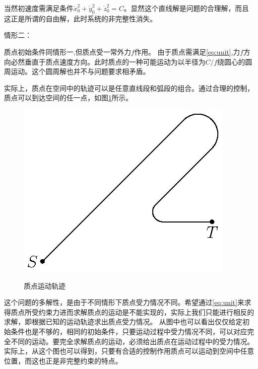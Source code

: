 \documentclass[A4,twoside]{ctexart}
\begin{document}
当然初速度需满足条件$\dot{x}_0^2+\dot{y}_0^2+\dot{z}_0^2 = C$。显然这个直线解是问题的合理解，而且这正是所谓的自由解，此时系统的非完整性消失。

情形二：

质点初始条件同情形一,但质点受一常外力$f$作用。
由于质点需满足\eqref{eq:unit},力$f$方向必然垂直于质点速度方向。此时质点的一种可能运动为以半径为$C/f$绕圆心的圆周运动。这个圆周解也并不与问题要求相矛盾。

实际上，质点在空间中的轨迹可以是任意直线段和弧段的组合。通过合理的控制，质点可以到达空间的任一点，如图\ref{figure:coordinate}所示。


\begin{figure}[!htp]
\centering
 \includegraphics[viewport=234 339 377 452,clip]{nonhol.eps}\\
\caption{质点运动轨迹}\label{figure:coordinate}
\end{figure}


这个问题的多解性，是由于不同情形下质点受力情况不同。希望通过\eqref{eq:unit}来求得质点所受约束力进而求解质点的运动是不能实现的，实际上我们只能进行相反的求解，即根据已知的运动轨迹求出质点受力情况。
从图中也可以看出仅仅给定初始条件也是不够的，相同的初始条件，只要运动过程中受力情况不同，可以对应完全不同的运动。要完全求解质点的运动，必须给出质点在运动过程中的受力情况。实际上，从这个图也可以得到，只要有合适的控制作用质点可以运动到空间中任意位置，而这也正是非完整约束的特点。
\end{document}

